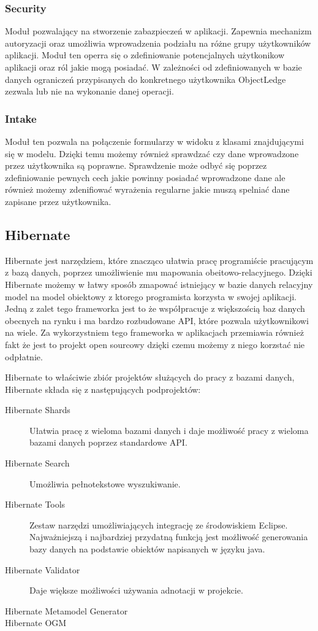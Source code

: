 \subsubsection{Security}
Moduł pozwalający na stworzenie zabazpieczeń w aplikacji. Zapewnia mechanizm autoryzacji oraz umożliwia 
wprowadzenia podziału na różne grupy użytkowników aplikacji. Moduł ten operra się o zdefiniowanie potencjalnych
użytkonikow aplikacji oraz ról jakie mogą posiadać. W zależności od zdefiniowanych w bazie danych ograniczeń
przypisanych do konkretnego użytkownika ObjectLedge zezwala lub nie na wykonanie danej operacji.
\subsubsection{Intake}
Moduł ten pozwala na połączenie formularzy w widoku z klasami znajdującymi się w modelu. Dzięki temu
możemy również sprawdzać czy dane wprowadzone przez użytkownika są poprawne. Sprawdzenie może odbyć się
poprzez zdefiniowanie pewnych cech jakie powinny posiadać wprowadzone dane ale również możemy zdenifiować
wyrażenia regularne jakie muszą spelniać dane zapisane przez użytkownika.
\subsection{Hibernate}
Hibernate jest narzędziem, które znacząco ułatwia pracę programiście pracującym z bazą danych, poprzez 
umożliwienie mu mapowania obeitowo-relacyjnego. 
Dzięki Hibernate możemy w łatwy sposób zmapować istniejący w bazie danych relacyjny model na model obiektowy
z ktorego programista korzysta w swojej aplikacji. Jedną z zalet tego frameworka jest to że współpracuje 
z większością baz danych obecnych na rynku i ma bardzo rozbudowane API, które pozwala użytkownikowi na wiele.
Za wykorzystniem tego frameworka w aplikacjach przemiawia również fakt że jest to projekt open sourcowy dzięki
czemu możemy z niego korzstać nie odpłatnie.

Hibernate to właściwie zbiór projektów służących do pracy z bazami danych, Hibernate składa się z następujących 
podprojektów:
\begin{description}
  \item[Hibernate Shards] Ułatwia pracę z wieloma bazami danych i daje możliwość pracy z wieloma bazami danych
  poprzez standardowe API.
  \item[Hibernate Search] Umożliwia pełnotekstowe wyszukiwanie.
  \item[Hibernate Tools] Zestaw narzędzi umożliwiających integrację ze środowiskiem Eclipse. Najważniejszą 
  i najbardziej przydatną funkcją jest możliwość generowania bazy danych na podstawie obiektów napisanych w
  języku java.
  \item[Hibernate Validator] Daje większe możliwości używania adnotacji w projekcie.
  \item[Hibernate Metamodel Generator] 
  \item[Hibernate OGM ]
\end{description}

